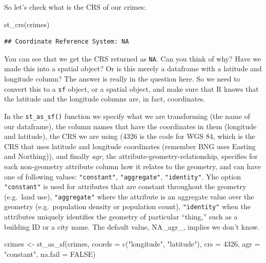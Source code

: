 \documentclass[
]{book}
\newenvironment{Shaded}{\begin{snugshade}}{\end{snugshade}}
\newcommand{\AttributeTok}[1]{\textcolor[rgb]{0.77,0.63,0.00}{#1}}
\newcommand{\ConstantTok}[1]{\textcolor[rgb]{0.00,0.00,0.00}{#1}}
\newcommand{\DecValTok}[1]{\textcolor[rgb]{0.00,0.00,0.81}{#1}}
\newcommand{\FunctionTok}[1]{\textcolor[rgb]{0.00,0.00,0.00}{#1}}
\newcommand{\NormalTok}[1]{#1}
\newcommand{\OtherTok}[1]{\textcolor[rgb]{0.56,0.35,0.01}{#1}}
\newcommand{\StringTok}[1]{\textcolor[rgb]{0.31,0.60,0.02}{#1}}
\begin{document}
So let's check what is the CRS of our crimes:

\begin{Shaded}
\begin{Highlighting}[]
\FunctionTok{st\_crs}\NormalTok{(crimes)}
\end{Highlighting}
\end{Shaded}

\begin{verbatim}
## Coordinate Reference System: NA
\end{verbatim}

You can see that we get the CRS returned as \texttt{NA}. Can you think of why? Have we made this into a spatial object? Or is this merely a dataframe with a latitude and longitude column? The answer is really in the question here. So we need to convert this to a \texttt{sf} object, or a spatial object, and make sure that R knows that the latitude and the longitude columns are, in fact, coordinates.

In the \texttt{st\_as\_sf()} function we specify what we are transforming (the name of our dataframe), the column names that have the coordinates in them (longitude and latitude), the CRS we are using (4326 is the code for WGS 84, which is the CRS that uses latitude and longitude coordinates (remember BNG uses Easting and Northing)), and finally \emph{agr}, the attribute-geometry-relationship, specifies for each non-geometry attribute column how it relates to the geometry, and can have one of following values: \texttt{"constant"}, \texttt{"aggregate"}, \texttt{"identity"}. Yhe option \texttt{"constant"} is used for attributes that are constant throughout the geometry (e.g.~land use), \texttt{"aggregate"} where the attribute is an aggregate value over the geometry (e.g.~population density or population count), \texttt{"identity"} when the attributes uniquely identifies the geometry of particular ``thing,'' such as a building ID or a city name. The default value, NA\_agr\_, implies we don't know.

\begin{Shaded}
\begin{Highlighting}[]
\NormalTok{crimes }\OtherTok{\textless{}{-}} \FunctionTok{st\_as\_sf}\NormalTok{(crimes, }\AttributeTok{coords =} \FunctionTok{c}\NormalTok{(}\StringTok{"longitude"}\NormalTok{, }\StringTok{"latitude"}\NormalTok{), }
                 \AttributeTok{crs =} \DecValTok{4326}\NormalTok{, }\AttributeTok{agr =} \StringTok{"constant"}\NormalTok{, }\AttributeTok{na.fail =} \ConstantTok{FALSE}\NormalTok{)}
\end{Highlighting}
\end{Shaded}
\end{document}
